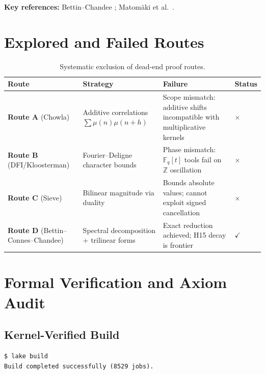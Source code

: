 \documentclass[11pt,a4paper]{article}
\theoremstyle{plain}
\theoremstyle{definition}
\theoremstyle{remark}
\begin{document}
\textbf{Key references:} Bettin--Chandee \cite{BettinChandee2015}; Matom\"aki et al.\ \cite{MRTT2023}.

\section{Explored and Failed Routes}
\label{sec:failed_routes}

\begin{table}[htbp]
\centering
\small
\begin{tabular}{lp{4cm}p{4.5cm}l}
\toprule
\textbf{Route} & \textbf{Strategy} & \textbf{Failure} & \textbf{Status} \\
\midrule
\textbf{Route A} (Chowla) & Additive correlations $\sum \mu(n)\mu(n+h)$ & Scope mismatch: additive shifts incompatible with multiplicative kernels & $\times$ \\
\textbf{Route B} (DFI/Kloosterman) & Fourier--Deligne character bounds & Phase mismatch: $\mathbb{F}_q[t]$ tools fail on $\mathbb{Z}$ oscillation & $\times$ \\
\textbf{Route C} (Sieve) & Bilinear magnitude via duality & Bounds absolute values; cannot exploit signed cancellation & $\times$ \\
\textbf{Route D} (Bettin--Connes--Chandee) & Spectral decomposition + trilinear forms & Exact reduction achieved; H15 decay is frontier & $\checkmark$ \\
\bottomrule
\end{tabular}
\caption{Systematic exclusion of dead-end proof routes.}
\label{tab:routes}
\end{table}

\section{Formal Verification and Axiom Audit}
\label{sec:audit}

\subsection{Kernel-Verified Build}

\begin{verbatim}
$ lake build
Build completed successfully (8529 jobs).
\end{verbatim}
\end{document}
